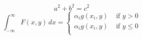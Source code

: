 \documentclass{article}
\begin{document}
\color{gray}

\zhlipsum[1]
\begin{equation}
a^2+b^2=c^2
\end{equation}
\zhlipsum[3]
\begin{equation}
    \int_{-\infty}^{\infty} F(x, y) \, dx =
    \begin{cases}
         \alpha_i g(x_i, y)  & \text{ if } y > 0 \\
         \alpha_i g(x_i, y)  & \text{ if } y \leq 0 \\
    \end{cases}
\end{equation}
\zhlipsum[5]
\end{document}
